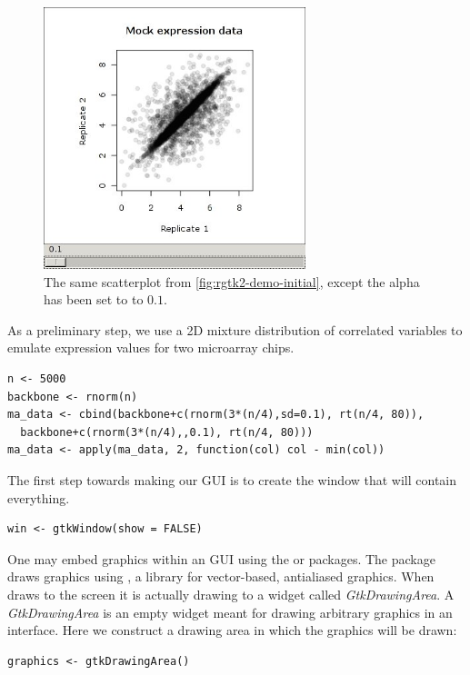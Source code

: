 \documentclass[article]{jss}
\begin{document}
\begin{figure}
\begin{center}
\includegraphics[width=3in]{demo-alpha-random-01-3}
\caption{\label{fig:rgtk2-demo-final}The same scatterplot from 
\ref{fig:rgtk2-demo-initial}, except the alpha has been set to to $0.1$.}
\end{center}
\end{figure}

As a preliminary step, we use a 2D mixture distribution of correlated variables
to emulate expression values for two microarray chips. 
\begin{verbatim}
n <- 5000
backbone <- rnorm(n)
ma_data <- cbind(backbone+c(rnorm(3*(n/4),sd=0.1), rt(n/4, 80)), 
  backbone+c(rnorm(3*(n/4),,0.1), rt(n/4, 80)))
ma_data <- apply(ma_data, 2, function(col) col - min(col))
\end{verbatim}

The first step towards making our GUI is to create the window that
will contain everything. 
\begin{verbatim}
win <- gtkWindow(show = FALSE)
\end{verbatim}

One may embed  graphics within an  GUI using the 
 \citep{cairoDevice} or  \citep{gtkDevice}
packages. The  package draws  graphics using 
 \citep{cairo}, a library for vector-based, antialiased graphics.
When  draws to the screen it is actually drawing to a 
 widget called \emph{GtkDrawingArea}. A \emph{GtkDrawingArea}
is an empty widget meant for drawing arbitrary graphics in an interface. Here we 
construct a drawing area in which the  graphics will be drawn:
\begin{verbatim}
graphics <- gtkDrawingArea()
\end{verbatim}
\end{document}
